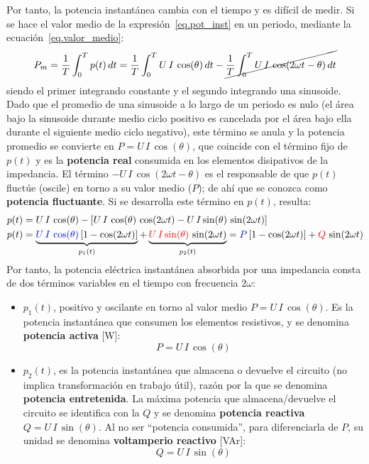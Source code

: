 \documentclass[11pt]{book} %
\numberwithin{dummy}{section}
\theoremstyle{ocrenumbox}
\theoremstyle{blacknumex}
\theoremstyle{blacknumbox}
\theoremstyle{ocrenum}
\newlength\esp
\begin{document}
	Por tanto, la potencia instantánea cambia con el tiempo y es difícil de medir. Si se hace el valor medio de la expresión~\eqref{eq.pot_inst} en un periodo, mediante la ecuación~\eqref{eq.valor_medio}:
	\begin{equation*}
		P_m=\dfrac{1}{T}\int_{0}^{T}p(t)\,dt=\dfrac{1}{T}\int_{0}^{T}U\,I\,\cos(\theta)\,dt-\cancel{\dfrac{1}{T}\int_{0}^{T}U\,I\,\cos(2\omega t-\theta)\,dt}
	\end{equation*}
	siendo el primer integrando constante y el segundo integrando una sinusoide. Dado que el promedio de una sinusoide a lo largo de un periodo es nulo (el área bajo la sinusoide durante medio ciclo positivo es cancelada por el área bajo ella durante el siguiente medio ciclo negativo), este término se anula y la potencia promedio se convierte en $P=U\,I\,\cos(\theta)$, que coincide con el término fijo de $p(t)$ y es la \textbf{potencia real} consumida en los elementos disipativos de la impedancia. El término $-U\,I\,\cos(2\omega t-\theta)$ es el responsable de que $p(t)$ fluctúe (oscile) en torno a su valor medio ($P$); de ahí que se conozca como \textbf{potencia fluctuante}. Si se desarrolla este término en $p(t)$, resulta: 
	\begin{align*}
		p(t)&=U\,I\,\cos(\theta)-\left[ U\,I\,\cos(\theta)\,\cos(2\omega t) - U\,I\sin(\theta)\,\sin(2\omega t)\right]\\
		p(t)&=\underbrace{{\color{blue}U\,I\,\cos(\theta)}\left[1-\cos(2\omega t)\right]}_{p_1(t)} + \underbrace{{\color{red}U\,I\sin(\theta)}\,\sin(2\omega t)}_{p_2(t)}={\color{blue}P}\left[1-\cos(2\omega t)\right] + {\color{red}Q}\,\sin(2\omega t)
	\end{align*}
	Por tanto, la potencia eléctrica instantánea absorbida por una impedancia consta de dos términos variables en el tiempo con frecuencia $2\omega$:
	\begin{itemize}
		\item $p_1(t)$, positivo y oscilante en torno al valor medio $P=U\,I\,\cos(\theta)$. Es la potencia instantánea que consumen los elementos resistivos, y se denomina \textbf{potencia activa} [W]:
		\begin{equation}
			\boxed{P=U\,I\,\cos(\theta)}
		\end{equation}
		\item $p_2(t)$, es la potencia instantánea que almacena o devuelve el circuito (no implica transformación en trabajo útil), razón por la que se denomina \textbf{potencia entretenida}. La máxima potencia que almacena/devuelve el circuito se identifica con la $Q$ y se denomina \textbf{potencia reactiva} $Q=U\,I\,\sin(\theta)$. Al no ser ``potencia consumida'', para diferenciarla de $P$, su unidad se denomina \textbf{voltamperio reactivo} [VAr]:
		\begin{equation}
			\boxed{Q=U\,I\,\sin(\theta)}
		\end{equation}
	\end{itemize}
	
\end{document}

